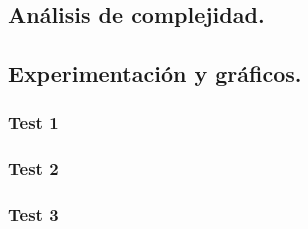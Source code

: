 
\subsection{Análisis de complejidad.}

\vspace*{0.3cm}


\vspace*{0.6cm}

\subsection{Experimentación y gráficos.}

\vspace*{0.3cm}


\subsubsection{Test 1}

\vspace*{0.3cm}


\vspace*{0.6cm}

\subsubsection{Test 2}

\vspace*{0.3cm}


\vspace*{0.6cm}

\subsubsection{Test 3}

\vspace*{0.3cm}


